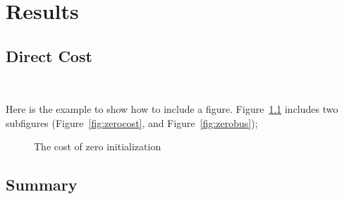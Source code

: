 \chapter{Results}
\label{cha:result}




\section{Direct Cost}\
\label{sec:direct_cost}

Here is the example to show how to include a figure. Figure~\ref{fig:cost}
includes two subfigures (Figure~\ref{fig:zerocost}, and Figure~\ref{fig:zerobus});

\begin{figure}
  \label{fig:cost}
  \caption{The cost of zero initialization}
\end{figure}


\section{Summary}
